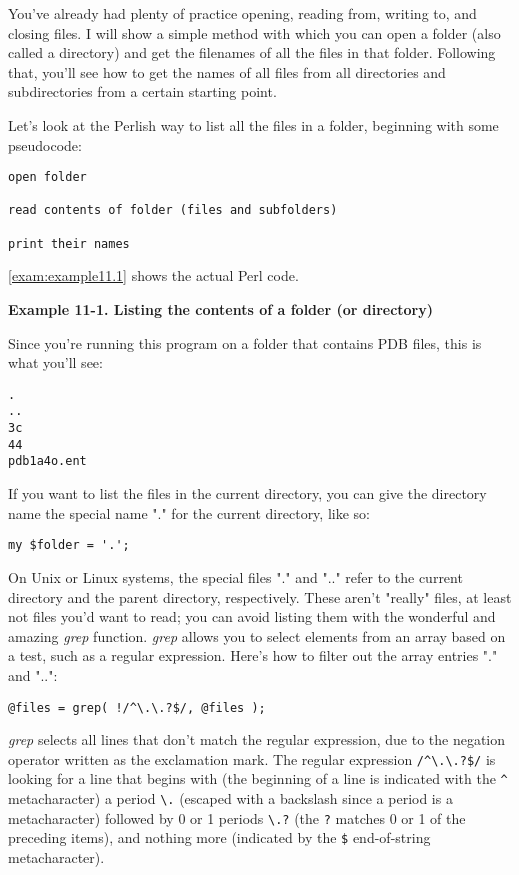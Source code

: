 You've already had plenty of practice opening, reading from, writing to, and closing files. I will show a simple method with which you can open a folder (also called a directory) and get the filenames of all the files in that folder. Following that, you'll see how to get the names of all files from all directories and subdirectories from a certain starting point.

Let's look at the Perlish way to list all the files in a folder, beginning with some pseudocode: 

\begin{lstlisting}
open folder

read contents of folder (files and subfolders)

print their names
\end{lstlisting}

\autoref{exam:example11.1} shows the actual Perl code.

\textbf{Example 11-1. Listing the contents of a folder (or directory)}


Since you're running this program on a folder that contains PDB files, this is what you'll see: 

\begin{lstlisting}
.
..
3c
44
pdb1a4o.ent
\end{lstlisting}

If you want to list the files in the current directory, you can give the directory name the special name "." for the current directory, like so:

\begin{lstlisting}
my $folder = '.';
\end{lstlisting}

On Unix or Linux systems, the special files "." and ".." refer to the current directory and the parent directory, respectively. These aren't "really" files, at least not files you'd want to read; you can avoid listing them with the wonderful and amazing \textit{grep} function. \textit{grep} allows you to select elements from an array based on a test, such as a regular expression. Here's how to filter out the array entries "." and "..": 

\begin{lstlisting}
@files = grep( !/^\.\.?$/, @files );
\end{lstlisting}

\textit{grep} selects all lines that don't match the regular expression, due to the negation operator written as the exclamation mark. The regular expression \verb|/^\.\.?$/| is looking for a line that begins with (the beginning of a line is indicated with the \verb|^| metacharacter) a period \verb|\.| (escaped with a backslash since a period is a metacharacter) followed by 0 or 1 periods \verb|\.?| (the \verb|?| matches 0 or 1 of the preceding items), and nothing more (indicated by the \verb|$| end-of-string metacharacter).

